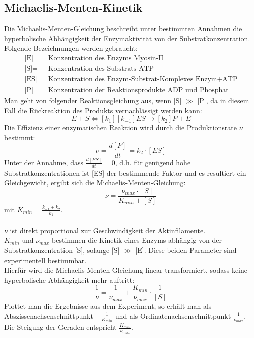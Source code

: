 \subsection{Michaelis-Menten-Kinetik}
Die Michaelis-Menten-Gleichung beschreibt unter bestimmten Annahmen die hyperbolische Abhängigkeit der Enzymaktivität von der Substratkonzentration.\\
Folgende Bezeichnungen werden gebraucht:\\
\begin{equation*}
\begin{aligned}
\text{[E]}=&\text{Konzentration des Enzyms Myosin-II}\\
\text{[S]}=&\text{Konzentration des Substrats ATP}\\
\text{[ES]}=&\text{Konzentration des Enzym-Substrat-Komplexes Enzym+ATP}\\
\text{[P]}=&\text{Konzentration der Reaktionsprodukte ADP und Phosphat}  
\end{aligned}
\end{equation*}
Man geht von folgender Reaktionsgleichung aus, wenn [S] $\gg$ [P], da in diesem Fall die Rückreaktion des Produkts vernachlässigt werden kann:
\begin{equation*}
E + S \Leftrightarrow[k_1][k_{-1}] ES \rightarrow[k_2] P + E  
\end{equation*}
Die Effizienz einer enzymatischen Reaktion wird durch die Produktionsrate $\nu$ bestimmt:
\begin{equation*}
\nu=\frac{d[P]}{dt}= k_{2}\cdot [ES]
\end{equation*}
Unter der Annahme, dass $\frac{d[ES]}{dt}=0$, d.h. für genügend hohe Substratkonzentrationen ist [ES] der bestimmende Faktor und es resultiert ein Gleichgewicht, ergibt sich die Michaelis-Menten-Gleichung:
\begin{equation}
\nu=\frac{\nu_{max}\cdot [S]}{K_{min} + [S]}
  \label{equ:michaelis_menten}
\end{equation}
mit $K_{min}=\frac{k_{-1}+k_2}{k_1}$.\\
\\
$\nu$ ist direkt proportional zur Geschwindigkeit der Aktinfilamente.\\
$K_{min}$ und $\nu_{max}$ bestimmen die Kinetik eines Enzyms abhängig von der Substratkonzentration [S], solange [S] $\gg$ [E]. Diese beiden Parameter sind experimentell bestimmbar.\\
Hierfür wird die Michaelis-Menten-Gleichung linear transformiert, sodass keine hyperbolische Abhängigkeit mehr auftritt:
\begin{equation}
\frac{1}{\nu}=\frac{1}{\nu_{max}}+\frac{K_{min}}{\nu_{max}}\cdot \frac{1}{[S]}
\end{equation}
Plottet man die Ergebnisse aus dem Experiment, so erhält man als Abszissenachsenschnittpunkt $-\frac{1}{K_{min}}$ und als Ordinatenachsenschnittpunkt $\frac{1}{\nu_{max}}$. Die Steigung der Geraden entspricht $\frac{K_{min}}{\nu_{max}}$.
